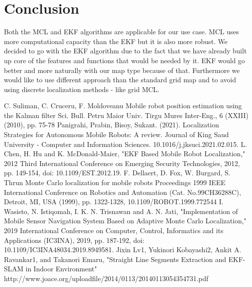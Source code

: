\documentclass[12pt, a4paper, onecolumn]{article}
\begin{document}
\section{Conclusion}

Both the MCL and EKF algorithms are applicable for our use case.
MCL uses more computational capacity than the EKF but it is also more robust.
We decided to go with the EKF algorithm due to the fact that we have already built up core of the features and functions that would be needed by it. EKF would go better and more naturally with our map type because of that. Furthermore we would like to use different approach than the standard grid map and to avoid using discrete localization methods - like grid MCL. 
\newpage
\begin{thebibliography}{9}

C. Suliman, C. Cruceru, F. Moldoveanu
Mobile robot position estimation using the Kalman filter
Sci. Bull. Petru Maior Univ. Tirgu Mures Inter-Eng., 6 (XXIII) (2010), pp. 75-78
Panigrahi, Prabin, Bisoy, Sukant. (2021). Localization Strategies for Autonomous Mobile Robots: A review. Journal of King Saud University - Computer and Information Sciences. 10.1016/j.jksuci.2021.02.015. 
L. Chen, H. Hu and K. McDonald-Maier, "EKF Based Mobile Robot Localization," 2012 Third International Conference on Emerging Security Technologies, 2012, pp. 149-154, doi: 10.1109/EST.2012.19.
F. Dellaert, D. Fox, W. Burgard, S. Thrun
Monte Carlo localization for mobile robots
Proceedings 1999 IEEE International Conference on Robotics and Automation (Cat. No.99CH36288C), Detroit, MI, USA (1999), pp. 1322-1328, 10.1109/ROBOT.1999.772544
I. Wasisto, N. Istiqomah, I. K. N. Trisnawan and A. N. Jati, "Implementation of Mobile Sensor Navigation System Based on Adaptive Monte Carlo Localization," 2019 International Conference on Computer, Control, Informatics and its Applications (IC3INA), 2019, pp. 187-192, doi: 10.1109/IC3INA48034.2019.8949581.
Jixin Lv1, Yukinori Kobayashi2, Ankit A. Ravankar1, and Takanori Emaru, "Straight Line Segments Extraction and EKF-SLAM in Indoor Environment" http://www.joace.org/uploadfile/2014/0113/20140113054354731.pdf
\end{thebibliography}
\end{document}
